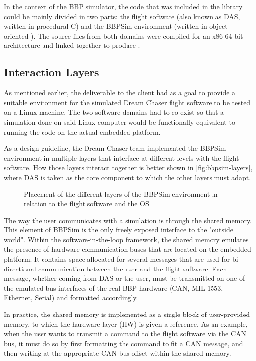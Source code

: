 {In the context of the \gls{BBP} simulator, the code that was included in the library could be mainly divided in two parts: the flight software (also known as \gls{DAS}, written in procedural C) and the \gls{BBPSim} environment (written in object-oriented \Cpp). The source files from both domains were compiled for an x86 64-bit architecture and linked together to produce .

\subsection*{Interaction Layers}
As mentioned earlier, the deliverable to the client had as a goal to provide a suitable environment for the simulated Dream Chaser flight software to be tested on a Linux machine. The two software domains had to co-exist so that a simulation done on said Linux computer would be functionally equivalent to running the code on the actual embedded platform. 

As a design guideline, the Dream Chaser team implemented the \gls{BBPSim} environment in multiple layers that interface at different levels with the flight software. How those layers interact together is better shown in \autoref{fig:bbpsim-layers}, where \gls{DAS} is taken as the core component to which the other layers must adapt.

\begin{figure}[htbp]
	\vspace{12pt}
	\centering
	
	\caption{Placement of the different layers of the BBPSim environment in relation to the flight software and the OS}
	\label{fig:bbpsim-layers}
\end{figure}

The way the user communicates with a simulation is through the shared memory. This element of \gls{BBPSim} is the only freely exposed interface to the "outside world". Within the software-in-the-loop framework, the shared memory emulates the presence of hardware communication buses that are located on the embedded platform. It contains space allocated for several messages that are used for bi-directional communication between the user and the flight software. Each message, whether coming from DAS or the user, must be transmitted on one of the emulated bus interfaces of the real \gls{BBP} hardware (CAN, MIL-1553, Ethernet, Serial) and formatted accordingly.

In practice, the shared memory is implemented as a single block of user-provided memory, to which the hardware layer (HW) is given a reference. As an example, when the user wants to transmit a command to the flight software via the CAN bus, it must do so by first formatting the command to fit a CAN message, and then writing at the appropriate CAN bus offset within the shared memory. 

}
